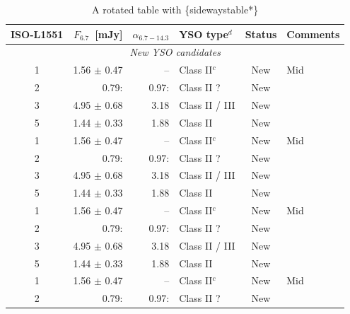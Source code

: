 \documentclass{aa}
\begin{document}
\begin{appendix}
\begin{table}
		\caption{A rotated table with \{sidewaystable*\}}
		\label{table:4}
		\centering
		\begin{tabular}{crrlcl}
			\hline
			ISO-L1551 & $F_{6.7}$~[mJy]  & $\alpha_{6.7-14.3}$ & YSO type$^{d}$ & Status         & Comments           \\
			\hline
			\multicolumn{6}{c}{\it New YSO candidates}                                                                \\ %
			\hline
			1         & 1.56 $\pm$ 0.47  & --                  & Class II$^{c}$ & New            & Mid                \\
			2         & 0.79:            & 0.97:               & Class II ?     & New            &                    \\
			3         & 4.95 $\pm$ 0.68  & 3.18                & Class II / III & New            &                    \\
			5         & 1.44 $\pm$ 0.33  & 1.88                & Class II       & New            &                    \\
			1         & 1.56 $\pm$ 0.47  & --                  & Class II$^{c}$ & New            & Mid                \\
			2         & 0.79:            & 0.97:               & Class II ?     & New            &                    \\
			3         & 4.95 $\pm$ 0.68  & 3.18                & Class II / III & New            &                    \\
			5         & 1.44 $\pm$ 0.33  & 1.88                & Class II       & New            &                    \\
			1         & 1.56 $\pm$ 0.47  & --                  & Class II$^{c}$ & New            & Mid                \\
			2         & 0.79:            & 0.97:               & Class II ?     & New            &                    \\
			3         & 4.95 $\pm$ 0.68  & 3.18                & Class II / III & New            &                    \\
			5         & 1.44 $\pm$ 0.33  & 1.88                & Class II       & New            &                    \\
			1         & 1.56 $\pm$ 0.47  & --                  & Class II$^{c}$ & New            & Mid                \\
			2         & 0.79:            & 0.97:               & Class II ?     & New            &                    \\

\end{tabular}
\end{table}
\end{appendix}
\end{document}
